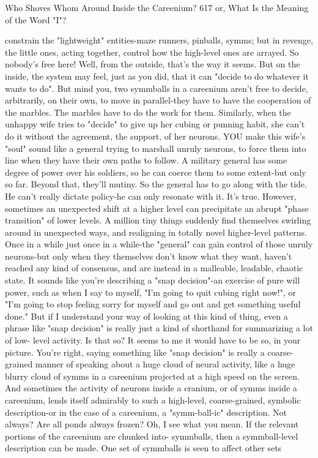 Who Shoves Whom Around Inside the Careenium?                                           617
or, What Is the Meaning of the Word "I"?

  constrain the "lightweight" entities-maze runners, pinballs, symms; but in revenge,
  the little ones, acting together, control how the high-level ones are arrayed.
\achilles So nobody's free here!
\tortoise Well, from the outside, that's the way it seems. But on the inside, the
  system may feel, just as you did, that it can "decide to do whatever it wants to do".
  But mind you, two symmballs in a careenium aren't free to decide, arbitrarily, on
  their own, to move in parallel-they have to have the cooperation of the marbles.
  The marbles have to do the work for them. Similarly, when the unhappy wife tries
  to "decide" to give up her cubing or punning habit, she can't do it without the
  agreement, the support, of her neurons.
\achilles YOU make this wife's "soul" sound like a general trying to marshall
  unruly neurons, to force them into line when they have their own paths to follow.
  A military general has some degree of power over his soldiers, so he can coerce
  them to some extent-but only so far. Beyond that, they'll mutiny. So the general has
  to go along with the tide. He can't really dictate policy-he can only resonate with it.
\tortoise It's true. However, sometimes an unexpected shift at a higher level can
  precipitate an abrupt "phase transition" of lower levels. A million tiny things
  suddenly find themselves swirling around in unexpected ways, and realigning in
  totally novel higher-level patterns. Once in a while just once in a while-the
  "general" can gain control of those unruly neurons-but only when they themselves
  don't know what they want, haven't reached any kind of consensus, and are instead
  in a malleable, leadable, chaotic state.
\achilles It sounds like you're describing a "snap decision"-an exercise of pure
  will power, such as when I say to myself, "I'm going to quit cubing right now!", or
  "I'm going to stop feeling sorry for myself and go out and get something useful
  done." But if I understand your way of looking at this kind of thing, even a phrase
  like "snap decision" is really just a kind of shorthand for summarizing a lot of low-
  level activity. Is that so? It seems to me it would have to be so, in your picture.
\tortoise You're right, saying something like "snap decision" is really a coarse-
  grained manner of speaking about a huge cloud of neural activity, like a huge
  blurry cloud of symms in a careenium projected at a high speed on the screen. And
  sometimes the activity of neurons inside a cranium, or of symms inside a
  careenium, lends itself admirably to such a high-level, coarse-grained, symbolic
  description-or in the case of a careenium, a "symm-ball-ic" description.
\achilles Not always?
\tortoise Are all ponds always frozen?
\achilles Oh, I see what you mean. If the relevant portions of the careenium are
  chunked into- symmballs, then a symmball-level description can be made. One set
  of symmballs is seen to affect other sets




